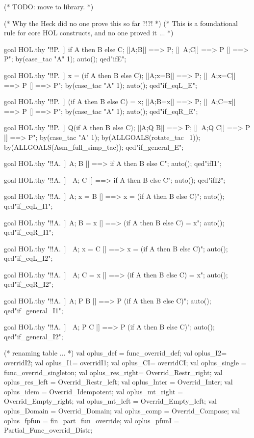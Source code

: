 \documentclass[a4paper,pdftex]{article}
\newenvironment{holz-proof}{\comment}{\endcomment}
\begin{document}
\begin{holz-proof}

(* TODO: move to library. *)


(* Why the Heck did no one prove this so far ?!?!                                *)
(* This is a foundational rule for core HOL constructs, and no one proved it ... *)

goal HOL.thy "!!P. [| if A then B else C; [|A;B|] ==> P; [|~A;C|] ==> P |] ==> P";
by(case_tac "A" 1);
auto();
qed"ifE";
 
goal HOL.thy "!!P. [| x = (if A then B else C); [|A;x=B|] ==> P; [|~A;x=C|] ==> P |] ==> P";
by(case_tac "A" 1);
auto();
qed"if_eqL_E";

goal HOL.thy "!!P. [| (if A then B else C) = x; [|A;B=x|] ==> P; [|~A;C=x|] ==> P |] ==> P";
by(case_tac "A" 1);
auto();
qed"if_eqR_E";

goal HOL.thy "!!P. [| Q(if A then B else C); [|A;Q B|] ==> P; [|~A;Q C|] ==> P |] ==> P";
by(case_tac "A" 1);
by(ALLGOALS(rotate_tac ~1));
by(ALLGOALS(Asm_full_simp_tac));
qed"if_general_E";

goal HOL.thy "!!A. [| A; B |] ==> if A then B else C";
auto();
qed"ifI1";

goal HOL.thy "!!A. [| ~A; C |] ==> if A then B else C";
auto();
qed"ifI2";

goal HOL.thy "!!A. [| A; x = B |] ==> x = (if A then B else C)";
auto();
qed"if_eqL_I1";

goal HOL.thy "!!A. [| A; B = x |] ==> (if A then B else C) = x";
auto();
qed"if_eqR_I1";

goal HOL.thy "!!A. [| ~A; x = C |] ==> x = (if A then B else C)";
auto();
qed"if_eqL_I2";

goal HOL.thy "!!A. [| ~A; C = x |] ==> (if A then B else C) = x";
auto();
qed"if_eqR_I2";

goal HOL.thy "!!A. [| A; P B |] ==> P (if A then B else C)";
auto();
qed"if_general_I1";

goal HOL.thy "!!A. [| ~A; P C |] ==> P (if A then B else C)";
auto();
qed"if_general_I2";


(* renaming table ... *)
val oplus_def       = func_overrid_def;
val oplus_I2= overridI2;
val oplus_I1= overridI1;
val oplus_CI= overridCI;
val oplus_single   = func_overrid_singleton;
val oplus_res_right= Overrid_Restr_right;
val oplus_res_left = Overrid_Restr_left;
val oplus_Inter    = Overrid_Inter;
val oplus_idem     = Overrid_Idempotent;
val oplus_mt_right = Overrid_Empty_right;
val oplus_mt_left  = Overrid_Empty_left;
val oplus_Domain   = Overrid_Domain;
val oplus_comp     = Overrid_Compose;
val oplus_fpfun    = fin_part_fun_override;
val oplus_pfunI    = Partial_Func_overrid_Distr;


\end{holz-proof}
\end{document}
